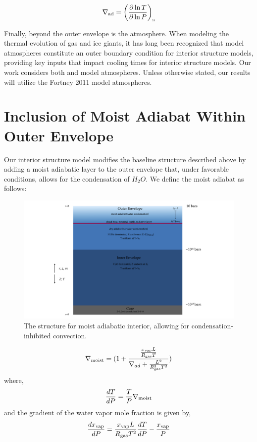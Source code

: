 \documentclass[11pt]{ucscthesisbs}
\begin{document}
\begin{equation}
\nabla_{\rm ad} = \left( \frac{\partial \ln T}{\partial \ln P} \right)_{\rm s}
\end{equation}

Finally, beyond the outer envelope is the atmosphere. When modeling the thermal evolution of gas and ice giants, it has long been recognized that model atmospheres constitute an outer boundary condition for interior structure models, providing key inputs that impact cooling times for interior structure models. Our work considers both \citep{graboske_1975} and \citep{fortney_2011} model atmospheres. Unless otherwise stated, our results will utilize the Fortney 2011 model atmospheres. 

\section{Inclusion of Moist Adiabat Within Outer Envelope}
Our interior structure model modifies the baseline structure described above by adding a moist adiabatic layer to the outer envelope that, under favorable conditions, allows for the condensation of $H_{2}O$. We define the moist adiabat as follows:

\begin{figure}[ht!]
 \centerline{
  \includegraphics[width=8.0in]{figures/moist_adiabat_structure.png}
 }
\caption[Interior Structure for Moist Adiabat]
{The structure for moist adiabatic interior, allowing for condensation-inhibited convection.}
\label{fig:moist_interior}
\end{figure}


\begin{equation}
\nabla_{\rm moist} = (1 + \frac{\frac{x_{\rm vap} L}{R_{\rm gas}T}}{\nabla_{ad} + \frac{L^2}{R_{\rm gas}^2 T^2}} )
\end{equation}
where,
\begin{equation}
\frac{dT}{dP} =\frac{T}{P}\nabla_{\rm moist}
\end{equation}
and the gradient of the water vapor mole fraction is given by,
\begin{equation}
\frac{d x_{\rm vap}}{dP} = \frac{x_{\rm vap} L}{R_{\rm gas} T^2} \frac{dT}{dP} - \frac{x_{\rm vap}}{P}
\end{equation}
\end{document}
